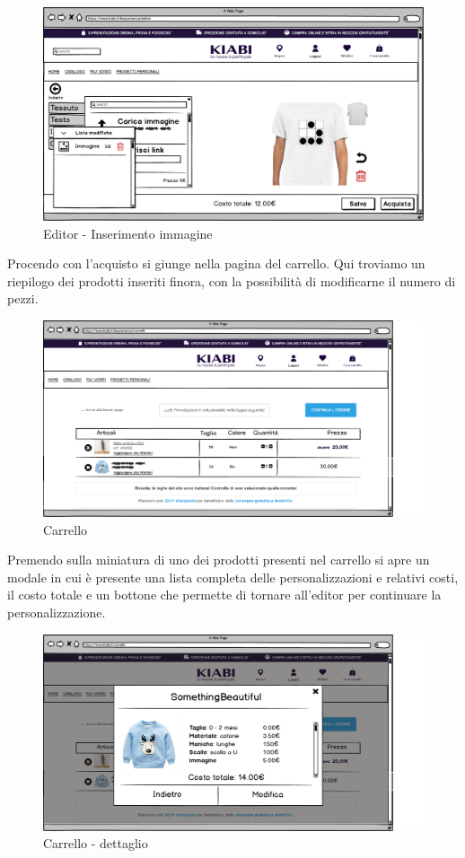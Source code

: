 \documentclass[12pt,italian,]{report}
\begin{document}
\begin{figure}[h]
\centering
\includegraphics{../balsamiq/balsamiq_finale/Editor-caratteristicabustoimmagine4.png}
\caption{Editor - Inserimento immagine}
\end{figure}

Procendo con l'acquisto si giunge nella pagina del carrello. Qui
troviamo un riepilogo dei prodotti inseriti finora, con la possibilità
di modificarne il numero di pezzi.

\begin{figure}[h]
\centering
\includegraphics{../balsamiq/balsamiq_finale/Carrello.png}
\caption{Carrello}
\end{figure}

Premendo sulla miniatura di uno dei prodotti presenti nel carrello si
apre un modale in cui è presente una lista completa delle
personalizzazioni e relativi costi, il costo totale e un bottone che
permette di tornare all'editor per continuare la personalizzazione.

\begin{figure}[h]
\centering
\includegraphics{../balsamiq/balsamiq_finale/Carrellodettagli.png}
\caption{Carrello - dettaglio}
\end{figure}
\end{document}
